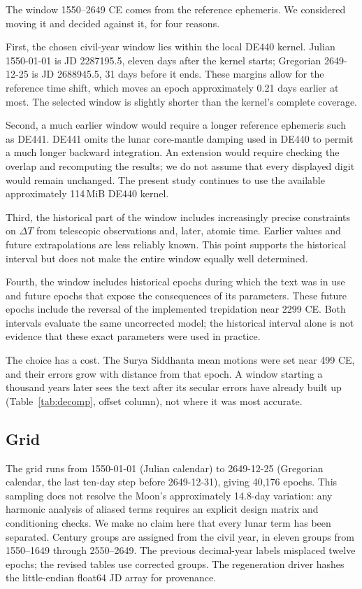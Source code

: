 \documentclass[11pt,a4paper]{article}
\newcommand{\dT}{$\Delta T$}
\begin{document}
The window 1550--2649 CE comes from the reference ephemeris. We considered moving it and decided against it, for four reasons.

First, the chosen civil-year window lies within the local DE440 kernel. Julian 1550-01-01 is JD 2287195.5, eleven days after the kernel starts; Gregorian 2649-12-25 is JD 2688945.5, 31 days before it ends. These margins allow for the reference time shift, which moves an epoch approximately 0.21 days earlier at most. The selected window is slightly shorter than the kernel's complete coverage.

Second, a much earlier window would require a longer reference ephemeris such as DE441. DE441 omits the lunar core-mantle damping used in DE440 to permit a much longer backward integration. An extension would require checking the overlap and recomputing the results; we do not assume that every displayed digit would remain unchanged. The present study continues to use the available approximately 114\,MiB DE440 kernel.

Third, the historical part of the window includes increasingly precise constraints on \dT{} from telescopic observations and, later, atomic time. Earlier values and future extrapolations are less reliably known. This point supports the historical interval but does not make the entire window equally well determined.

Fourth, the window includes historical epochs during which the text was in use and future epochs that expose the consequences of its parameters. These future epochs include the reversal of the implemented trepidation near 2299 CE. Both intervals evaluate the same uncorrected model; the historical interval alone is not evidence that these exact parameters were used in practice.

The choice has a cost. The Surya Siddhanta mean motions were set near 499 CE, and their errors grow with distance from that epoch. A window starting a thousand years later sees the text after its secular errors have already built up (Table~\ref{tab:decomp}, offset column), not where it was most accurate.

\subsection{Grid}
\label{sec:grid}

The grid runs from 1550-01-01 (Julian calendar) to 2649-12-25 (Gregorian calendar, the last ten-day step before 2649-12-31), giving 40,176 epochs. This sampling does not resolve the Moon's approximately 14.8-day variation: any harmonic analysis of aliased terms requires an explicit design matrix and conditioning checks. We make no claim here that every lunar term has been separated. Century groups are assigned from the civil year, in eleven groups from 1550--1649 through 2550--2649. The previous decimal-year labels misplaced twelve epochs; the revised tables use corrected groups. The regeneration driver hashes the little-endian float64 JD array for provenance.
\end{document}
